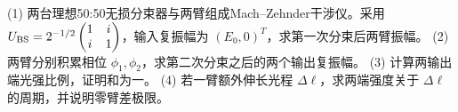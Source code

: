 (1) 两台理想50:50无损分束器与两臂组成Mach–Zehnder干涉仪。采用 \(U_{\rm BS}=2^{-1/2}\begin{pmatrix}1&i\\i&1\end{pmatrix}\)，输入复振幅为 \((E_0,0)^T\)，求第一次分束后两臂振幅。
(2) 两臂分别积累相位 \(\phi_1,\phi_2\)，求第二次分束之后的两个输出复振幅。
(3) 计算两输出端光强比例，证明和为一。
(4) 若一臂额外伸长光程 \(\Delta\ell\)，求两端强度关于 \(\Delta\ell\) 的周期，并说明零臂差极限。

